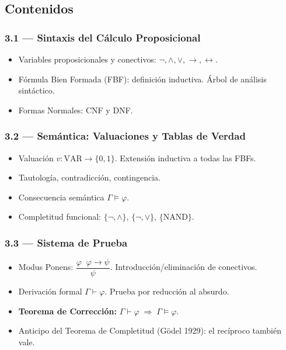 \documentclass[11pt, letterpaper]{article}
\begin{document}
\subsection{Contenidos}

\subsubsection{3.1 --- Sintaxis del C\'alculo Proposicional}
\begin{itemize}
  \item Variables proposicionales y conectivos: $\neg, \land, \lor, \to, \leftrightarrow$.
  \item F\'ormula Bien Formada (FBF): definici\'on inductiva. \'Arbol de an\'alisis sint\'actico.
  \item Formas Normales: CNF y DNF.
\end{itemize}

\subsubsection{3.2 --- Sem\'antica: Valuaciones y Tablas de Verdad}
\begin{itemize}
  \item Valuaci\'on $v:\text{VAR}\to\{0,1\}$. Extensi\'on inductiva a todas las FBFs.
  \item Tautolog\'ia, contradicci\'on, contingencia.
  \item Consecuencia sem\'antica $\Gamma\models\varphi$.
  \item Completitud funcional: $\{\neg,\land\}$, $\{\neg,\lor\}$, $\{\text{NAND}\}$.
\end{itemize}

\subsubsection{3.3 --- Sistema de Prueba}
\begin{itemize}
  \item Modus Ponens: $\dfrac{\varphi\;\;\varphi\to\psi}{\psi}$. Introducci\'on/eliminaci\'on de conectivos.
  \item Derivaci\'on formal $\Gamma\vdash\varphi$. Prueba por reducci\'on al absurdo.
  \item \textbf{Teorema de Correcci\'on:} $\Gamma\vdash\varphi \;\Rightarrow\; \Gamma\models\varphi$.
  \item Anticipo del Teorema de Completitud (G\"odel 1929): el rec\'iproco tambi\'en vale.
\end{itemize}
\end{document}
